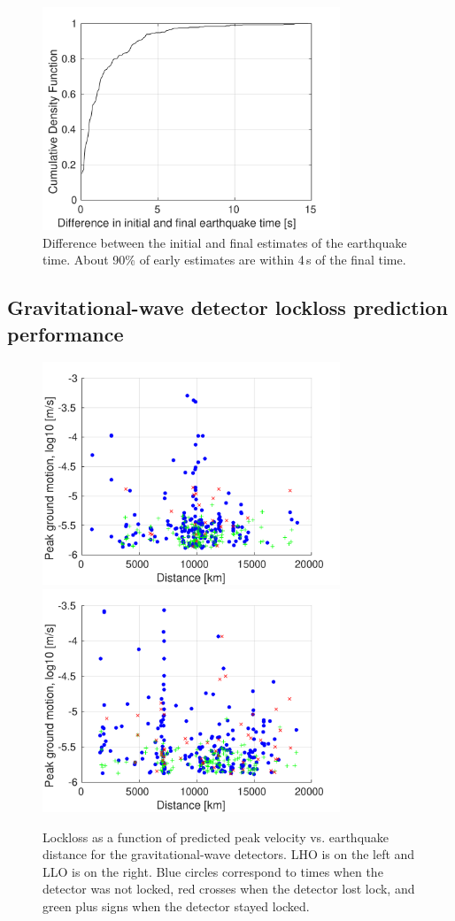 \documentclass[twocolumn, aps, superscriptaddress]{revtex4}
\begin{document}
\begin{figure}[t]
\hspace*{-0.5cm}
 \includegraphics[width=3.5in]{lockloss_est_timediff.pdf}
 \caption{Difference between the initial and final estimates of the earthquake time. About 90\% of early estimates are within 4\,s of the final time.}
 \label{fig:initialvsfinal}
\end{figure}

\subsection{Gravitational-wave detector lockloss prediction performance}

\begin{figure}[t]
\hspace*{-0.5cm}
 \includegraphics[width=3.5in]{lockloss_vel_distance_LHO.pdf}
  \includegraphics[width=3.5in]{lockloss_vel_distance_LLO.pdf}
 \caption{Lockloss as a function of predicted peak velocity vs. earthquake distance for the gravitational-wave detectors. LHO is on the left and LLO is on the right. Blue circles correspond to times when the detector was not locked, red crosses when the detector lost lock, and green plus signs when the detector stayed locked.}
 \label{fig:lockloss}
\end{figure}
\end{document}
